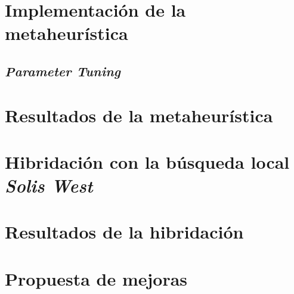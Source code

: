 \documentclass[11pt]{article}
\begin{document}
\pagebreak
\section{Implementación de la metaheurística} \label{implementacion}

\subsection{\emph{Parameter Tuning}} \label{tuning}

\pagebreak
\section{Resultados de la metaheurística}

\pagebreak
\section{Hibridación con la búsqueda local \emph{Solis West}}

\pagebreak
\section{Resultados de la hibridación}

\pagebreak
\section{Propuesta de mejoras}

\pagebreak



\end{document}
